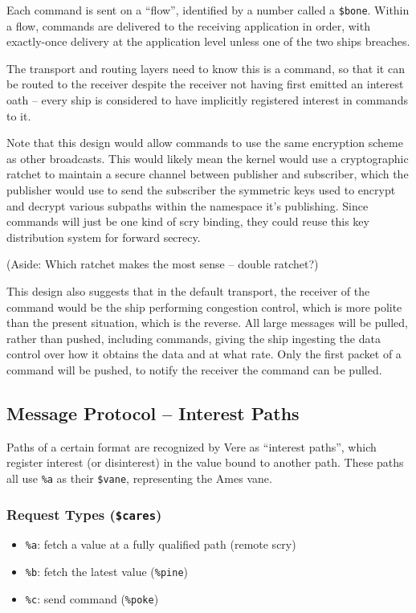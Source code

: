\documentclass[twoside]{article}
\begin{document}
Each command is sent on a ``flow'', identified by a number called a \lstinline[style=inlinecode]{$bone}. Within a flow, commands are delivered to the receiving application in order, with exactly-once delivery at the application level unless one of the two ships breaches.

The transport and routing layers need to know this is a command, so that it can be routed to the receiver despite the receiver not having first emitted an interest oath – every ship is considered to have implicitly registered interest in commands to it.

Note that this design would allow commands to use the same encryption scheme as other broadcasts. This would likely mean the kernel would use a cryptographic ratchet to maintain a secure channel between publisher and subscriber, which the publisher would use to send the subscriber the symmetric keys used to encrypt and decrypt various subpaths within the namespace it's publishing. Since commands will just be one kind of scry binding, they could reuse this key distribution system for forward secrecy.

(Aside:  Which ratchet makes the most sense – double ratchet?)

This design also suggests that in the default transport, the receiver of the command would be the ship performing congestion control, which is more polite than the present situation, which is the reverse. All large messages will be pulled, rather than pushed, including commands, giving the ship ingesting the data control over how it obtains the data and at what rate. Only the first packet of a command will be pushed, to notify the receiver the command can be pulled.

\subsection{Message Protocol – Interest Paths}

Paths of a certain format are recognized by Vere as ``interest paths'', which register interest (or disinterest) in the value bound to another path. These paths all use \lstinline[style=inlinecode]{%a} as their \lstinline[style=inlinecode]{$vane}, representing the Ames vane.

\subsubsection{Request Types (\texttt{\$cares})}

\begin{itemize}
  \item  \lstinline[style=inlinecode]{%a}: fetch a value at a fully qualified path (remote scry)
  \item  \lstinline[style=inlinecode]{%b}: fetch the latest value (\lstinline[style=inlinecode]{%pine})
  \item  \lstinline[style=inlinecode]{%c}: send command (\lstinline[style=inlinecode]{%poke})
\end{itemize}
\end{document}
